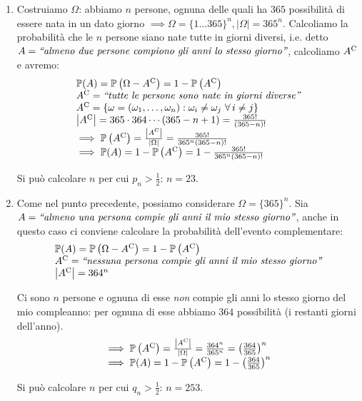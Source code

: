 \begin{enumerate}
\item Costruiamo $\Omega $: abbiamo $n$ persone, ognuna delle quali ha $365$ possibilità di essere nata in un dato giorno $\implies \Omega =\{1\dots 365\}^{n} ,| \Omega | =365^{n}$. Calcoliamo la probabilità che le $n$ persone siano nate tutte in giorni diversi, i.e. detto $A=\emph{``almeno due persone compiono gli anni lo stesso giorno''}$, calcoliamo $A^{\mathrm{C}}$ e avremo:\begin{equation*}
\begin{array}{ l }
\PP(A) =\PP\left(\Omega -A\complementary\right) =1-\PP\left(A\complementary\right)\\
A\complementary =\event{tutte le persone sono nate in giorni diverse}\\
A\complementary =\{\omega =(\omega _{1} ,\dots ,\omega _{n}) :\omega _{i} \neq \omega _{j} \ \forall i\neq j\}\\
\left| A\complementary\right| =365\cdot 364\cdots (365-n+1) =\frac{365!}{(365-n) !}\\
\implies \PP\left(A\complementary\right) =\frac{\left| A\complementary\right| }{| \Omega | } =\frac{365!}{365^{n}(365-n) !}\\
\implies \PP(A) =1-\PP\left(A\complementary\right) =1-\frac{365!}{365^{n}(365-n) !}
\end{array}
\end{equation*}

Si può calcolare $n$ per cui $p_{n}  >\frac{1}{2}$: $n=23$.
\item Come nel punto precedente, possiamo considerare $\Omega =\{365\}^{n}$. Sia $A=\emph{``almeno una persona compie gli anni il mio stesso giorno''}$, anche in questo caso ci conviene calcolare la probabilità dell'evento complementare:\begin{equation*}
\begin{array}{ l }
\mathbb{P}(A) =\mathbb{P}\left(\Omega -A^{\mathrm{C}}\right) =1-\mathbb{P}\left(A^{\mathrm{C}}\right)\\
A^{\mathrm{C}} =\emph{``nessuna persona compie gli anni il mio stesso giorno''}\\
\left| A^{\mathrm{C}}\right| =364^{n}
\end{array}
\end{equation*}

Ci sono $n$ persone e ognuna di esse \textit{non} compie gli anni lo stesso giorno del mio compleanno: per ognuna di esse abbiamo $364$ possibilità (i restanti giorni dell'anno).\begin{equation*}
\begin{array}{ l }
\implies \mathbb{P}\left(A^{\mathrm{C}}\right) =\frac{\left| A^{\mathrm{C}}\right| }{| \Omega | } =\frac{364^{n}}{365^{n}} =\left(\frac{364}{365}\right)^{n}\\
\implies \mathbb{P}(A) =1-\mathbb{P}\left(A^{\mathrm{C}}\right) =1-\left(\frac{364}{365}\right)^{n}
\end{array}
\end{equation*}

Si può calcolare $n$ per cui $q_{n}  >\frac{1}{2}$: $n=253$.
\end{enumerate}

